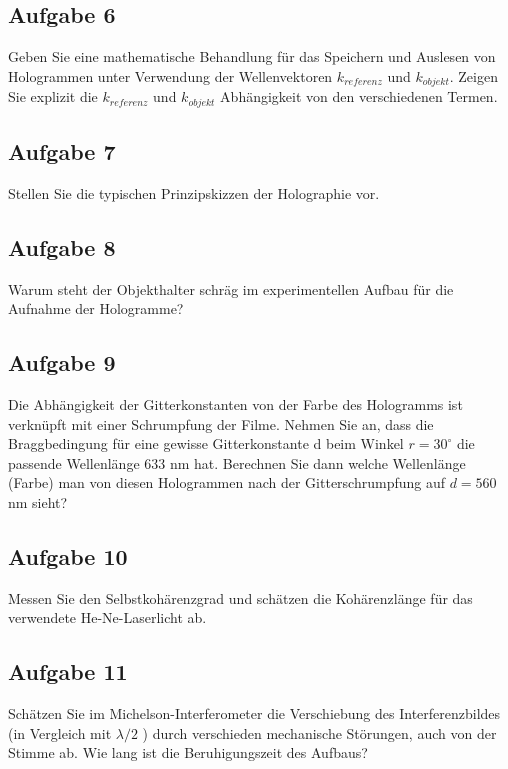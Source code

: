 \subsection*{Aufgabe 6}
Geben Sie eine mathematische Behandlung für das Speichern und Auslesen von Hologrammen unter Verwendung der Wellenvektoren $k_{referenz}$ 
und $k_{objekt}$. Zeigen Sie explizit die $k_{referenz}$ und $k_{objekt}$ Abhängigkeit von den verschiedenen Termen. 

\subsection*{Aufgabe 7}
Stellen Sie die typischen Prinzipskizzen der Holographie vor.

\subsection*{Aufgabe 8} 
Warum steht der Objekthalter schräg im experimentellen Aufbau für die Aufnahme der Hologramme? 

\subsection*{Aufgabe 9}
Die Abhängigkeit der Gitterkonstanten von der Farbe des Hologramms ist verknüpft mit einer Schrumpfung der Filme. Nehmen Sie an, dass die Braggbedingung für eine gewisse Gitterkonstante d beim Winkel $r = 30^{\circ}$ die passende Wellenlänge 633 nm hat. Berechnen Sie dann welche Wellenlänge (Farbe) man von diesen Hologrammen nach der Gitterschrumpfung auf $d = 560$ nm sieht? 

\subsection*{Aufgabe 10}
Messen Sie den Selbstkohärenzgrad und schätzen die Kohärenzlänge für das verwendete He-Ne-Laserlicht ab. 

\subsection*{Aufgabe 11}
Schätzen Sie im Michelson-Interferometer die Verschiebung des Interferenzbildes (in Vergleich mit $\lambda/2$ ) durch verschieden mechanische Störungen, auch von der Stimme ab. Wie lang ist die Beruhigungszeit des Aufbaus?